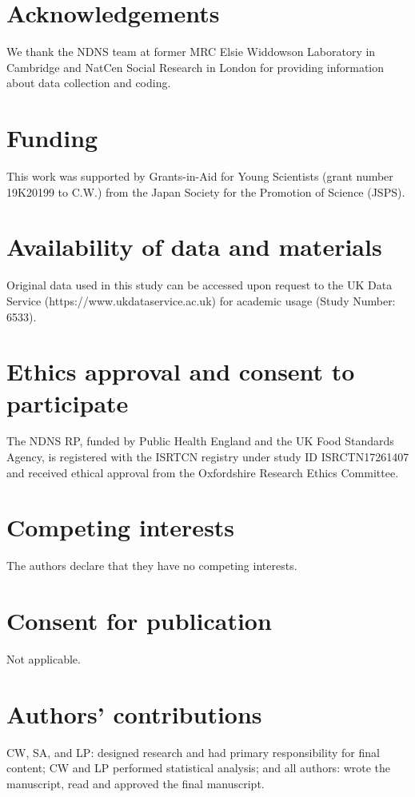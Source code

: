 \documentclass{bmcart}
\begin{document}
\begin{backmatter}

\section*{Acknowledgements}%
We thank the NDNS team at former MRC Elsie Widdowson Laboratory in Cambridge and NatCen Social Research in London for providing information about data collection and coding. 

\section*{Funding}%
This work was supported by Grants-in-Aid for Young Scientists (grant number 19K20199 to C.W.) from the Japan Society for the Promotion of Science (JSPS).


\section*{Availability of data and materials}%
Original data used in this study can be accessed upon request to the UK Data Service (https://www.ukdataservice.ac.uk) for academic usage (Study Number: 6533).

\section*{Ethics approval and consent to participate}%
The NDNS RP, funded by Public Health England and the UK Food Standards Agency, is registered with the ISRTCN registry under study ID ISRCTN17261407 and received ethical approval from the Oxfordshire Research Ethics Committee. 

\section*{Competing interests}
The authors declare that they have no competing interests.

\section*{Consent for publication}
Not applicable.

\section*{Authors' contributions}
CW, SA, and LP: designed research and had primary responsibility for final content; CW and LP performed statistical analysis; and all authors: wrote the manuscript, read and approved the final manuscript.


\end{backmatter}
\end{document}
